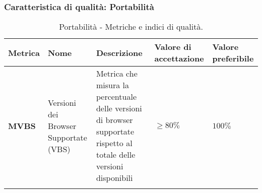 \subsubsection{Caratteristica di qualità: Portabilità}
\hspace{1pt}
            \begin{longtable}{|C{1.5cm}|L{3cm}|L{4cm}|L{2.5cm}|L{2.5cm}|}
                    \hline
                    \textbf{Metrica} & \textbf{Nome} & \textbf{Descrizione} & \textbf{Valore di accettazione} & \textbf{Valore preferibile} \\
                    \hline
                    \textbf{MVBS} & Versioni dei Browser Supportate (VBS) & Metrica che misura la percentuale delle versioni di browser supportate rispetto al totale delle versioni disponibili & $\geq 80\%$ & $100\%$\\
                    \hline
                    \caption{Portabilità - Metriche e indici di qualità.}
                \label{tab:metriche_portabilità_testo}
            \end{longtable}